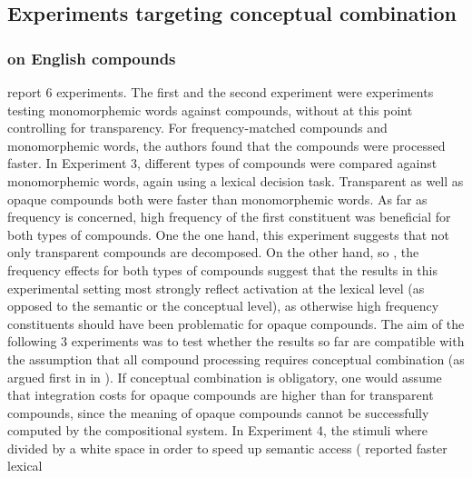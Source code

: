\subsection{Experiments targeting conceptual combination}
\label{sec:exp-concepts-trans}

\subsubsection{\citet{Jietal:2011} on English compounds}
\label{sec:jieetal2011}

\citet{Jietal:2011} report 6
experiments. The first and the second experiment were  experiments testing
monomorphemic words against compounds, without at this point controlling for
transparency. For frequency-matched compounds and monomorphemic words, the
authors found that the compounds were processed faster.
In Experiment 3, different types of compounds were compared against
monomorphemic words, again using a lexical decision task.
Transparent as well as opaque compounds both were faster than
monomorphemic words. 
As far as frequency is concerned, high frequency of the first
constituent was beneficial for both types of compounds. 
One the one
hand, this experiment suggests that not only transparent compounds are
decomposed. On the other hand, so \citet{Jietal:2011}, the frequency
effects for both types of compounds suggest that the results in this
experimental setting most strongly reflect activation at the lexical
level (as opposed to the semantic or the conceptual level), as
otherwise high frequency constituents should have been problematic for
opaque compounds. The aim of the following 3 experiments was to
test whether the results so far are compatible with the assumption
that all compound processing requires conceptual combination (as
argued first in in \citealt{GagneandSpalding:2004}). %
If conceptual
combination is obligatory, one would assume that integration costs for
opaque compounds are higher than for transparent compounds, since the
meaning of opaque compounds cannot be successfully computed by the
compositional system. In Experiment 4, the stimuli where divided by a
white space in order to speed up semantic access
(\citealt{Juhaszetal:2005} reported faster lexical
